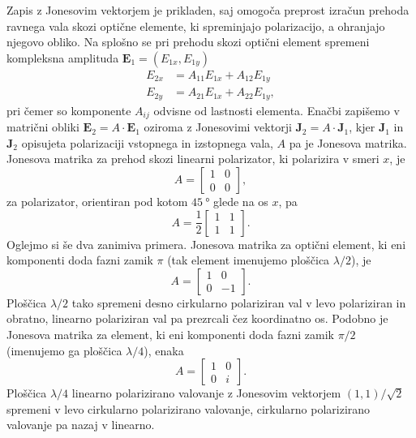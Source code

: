 Zapis z Jonesovim vektorjem je prikladen, saj omogoča preprost izračun
prehoda ravnega vala skozi optične elemente, ki spreminjajo polarizacijo,
a ohranjajo njegovo obliko. Na splošno se pri prehodu skozi
optični element spremeni kompleksna amplituda $\mathbf{E}_1 = (E_{1x}, E_{1y})$
\begin{align}
E_{2x} & =A_{11}E_{1x}+A_{12}E_{1y}\\
E_{2y} & =A_{21}E_{1x}+A_{22}E_{1y},
\end{align}
pri čemer so komponente $A_{ij}$ odvisne od lastnosti elementa. 
Enačbi zapišemo 
v matrični obliki $\mathbf{E}_{2}=A\cdot\mathbf{E}_{1}$ oziroma z Jonesovimi
vektorji $\mathbf{J}_{2}=A\cdot\mathbf{J}_{1}$, kjer $\mathbf{J}_{1}$ in $\mathbf{J}_{2}$
opisujeta polarizaciji vstopnega in izstopnega vala, $A$ pa je Jonesova matrika. Jonesova matrika za prehod skozi linearni polarizator, ki
polarizira v smeri $x$, je
\begin{equation}
A=\left[\begin{array}{cc}
1 & 0\\
0 & 0
\end{array}\right],
\end{equation}
za polarizator, orientiran pod kotom $45~\si{\degree}$ glede na os $x$, pa
\begin{equation}
A=\frac{1}{2}\left[\begin{array}{cc}
1 & 1\\
1 & 1
\end{array}\right].
\end{equation}
Oglejmo si še dva zanimiva primera.
Jonesova matrika za optični element, ki eni komponenti doda fazni zamik $\pi$ 
(tak element imenujemo ploščica $\lambda/2$), je
\begin{equation}
A=\left[\begin{array}{cc}
1 & 0\\
0 & -1
\end{array}\right].
\end{equation}
Ploščica $\lambda/2$ tako spremeni desno cirkularno polariziran val v levo 
polariziran in obratno, linearno polariziran val pa prezrcali čez koordinatno os. 
Podobno je Jonesova matrika za element, ki eni komponenti doda fazni zamik $\pi/2$ 
(imenujemo ga ploščica $\lambda/4$), enaka
\begin{equation}
A=\left[\begin{array}{cc}
1 & 0\\
0 & i
\end{array}\right].
\end{equation}
Ploščica $\lambda/4$ linearno polarizirano valovanje z Jonesovim vektorjem $(1,1)/\sqrt{2}$
spremeni v levo cirkularno polarizirano valovanje, cirkularno polarizirano
valovanje pa nazaj v linearno. 

